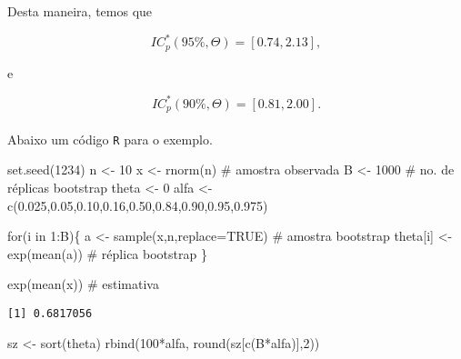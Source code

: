 \documentclass[
  letterpaper,
  DIV=11,
  numbers=noendperiod]{scrreprt}
\newenvironment{Shaded}{\begin{snugshade}}{\end{snugshade}}
\newcommand{\AttributeTok}[1]{\textcolor[rgb]{0.40,0.45,0.13}{#1}}
\newcommand{\CommentTok}[1]{\textcolor[rgb]{0.37,0.37,0.37}{#1}}
\newcommand{\ConstantTok}[1]{\textcolor[rgb]{0.56,0.35,0.01}{#1}}
\newcommand{\ControlFlowTok}[1]{\textcolor[rgb]{0.00,0.23,0.31}{#1}}
\newcommand{\DecValTok}[1]{\textcolor[rgb]{0.68,0.00,0.00}{#1}}
\newcommand{\FloatTok}[1]{\textcolor[rgb]{0.68,0.00,0.00}{#1}}
\newcommand{\FunctionTok}[1]{\textcolor[rgb]{0.28,0.35,0.67}{#1}}
\newcommand{\NormalTok}[1]{\textcolor[rgb]{0.00,0.23,0.31}{#1}}
\newcommand{\OtherTok}[1]{\textcolor[rgb]{0.00,0.23,0.31}{#1}}
\newcommand{\SpecialCharTok}[1]{\textcolor[rgb]{0.37,0.37,0.37}{#1}}
\begin{document}
Desta maneira, temos que

\[IC_p^*\left(95\%,\Theta\right)=\left[0.74, 2.13\right],\]

e

\[IC_p^*\left(90\%,\Theta\right)=\left[0.81, 2.00\right].\]\\
Abaixo um código \texttt{R} para o exemplo.

\begin{Shaded}
\begin{Highlighting}[]
\FunctionTok{set.seed}\NormalTok{(}\DecValTok{1234}\NormalTok{)}
\NormalTok{n }\OtherTok{\textless{}{-}} \DecValTok{10}
\NormalTok{x }\OtherTok{\textless{}{-}} \FunctionTok{rnorm}\NormalTok{(n) }\CommentTok{\# amostra observada}
\NormalTok{B }\OtherTok{\textless{}{-}} \DecValTok{1000}     \CommentTok{\# no. de réplicas bootstrap}
\NormalTok{theta }\OtherTok{\textless{}{-}} \DecValTok{0}
\NormalTok{alfa }\OtherTok{\textless{}{-}} \FunctionTok{c}\NormalTok{(}\FloatTok{0.025}\NormalTok{,}\FloatTok{0.05}\NormalTok{,}\FloatTok{0.10}\NormalTok{,}\FloatTok{0.16}\NormalTok{,}\FloatTok{0.50}\NormalTok{,}\FloatTok{0.84}\NormalTok{,}\FloatTok{0.90}\NormalTok{,}\FloatTok{0.95}\NormalTok{,}\FloatTok{0.975}\NormalTok{)}

\ControlFlowTok{for}\NormalTok{(i }\ControlFlowTok{in} \DecValTok{1}\SpecialCharTok{:}\NormalTok{B)\{}
\NormalTok{  a }\OtherTok{\textless{}{-}} \FunctionTok{sample}\NormalTok{(x,n,}\AttributeTok{replace=}\ConstantTok{TRUE}\NormalTok{)  }\CommentTok{\# amostra bootstrap}
\NormalTok{  theta[i] }\OtherTok{\textless{}{-}} \FunctionTok{exp}\NormalTok{(}\FunctionTok{mean}\NormalTok{(a))       }\CommentTok{\# réplica bootstrap }
\NormalTok{\}}

\FunctionTok{exp}\NormalTok{(}\FunctionTok{mean}\NormalTok{(x)) }\CommentTok{\# estimativa}
\end{Highlighting}
\end{Shaded}

\begin{verbatim}
[1] 0.6817056
\end{verbatim}

\begin{Shaded}
\begin{Highlighting}[]
\NormalTok{sz }\OtherTok{\textless{}{-}} \FunctionTok{sort}\NormalTok{(theta)}
\FunctionTok{rbind}\NormalTok{(}\DecValTok{100}\SpecialCharTok{*}\NormalTok{alfa, }\FunctionTok{round}\NormalTok{(sz[}\FunctionTok{c}\NormalTok{(B}\SpecialCharTok{*}\NormalTok{alfa)],}\DecValTok{2}\NormalTok{)) }
\end{Highlighting}
\end{Shaded}
\end{document}
